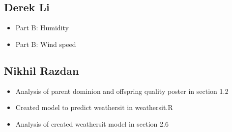 \documentclass[12pt]{article}
\begin{document}
\subsection*{Derek Li}
\begin{itemize}
\item Part B: Humidity
\item Part B: Wind speed
\end{itemize}

\subsection*{Nikhil Razdan}
\begin{itemize}
\item Analysis of parent dominion and offspring quality poster in section 1.2
\item Created model to predict weathersit in weathersit.R
\item Analysis of created weathersit model in section 2.6
\end{itemize}

\newpage
\appendix 
\end{document}
